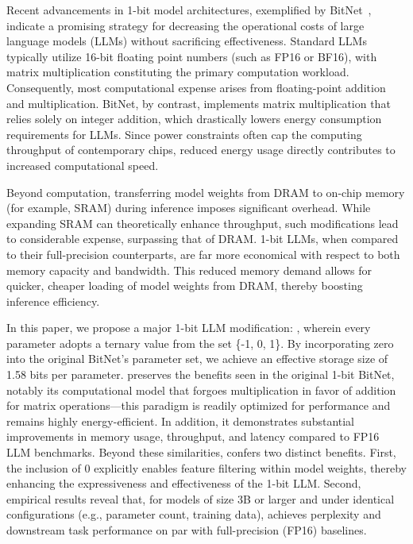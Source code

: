 Recent advancements in 1-bit model architectures, exemplified by BitNet~\cite{bitnet}, indicate a promising strategy for decreasing the operational costs of large language models (LLMs) without sacrificing effectiveness. Standard LLMs typically utilize 16-bit floating point numbers (such as FP16 or BF16), with matrix multiplication constituting the primary computation workload. Consequently, most computational expense arises from floating-point addition and multiplication. BitNet, by contrast, implements matrix multiplication that relies solely on integer addition, which drastically lowers energy consumption requirements for LLMs. Since power constraints often cap the computing throughput of contemporary chips, reduced energy usage directly contributes to increased computational speed.

Beyond computation, transferring model weights from DRAM to on-chip memory (for example, SRAM) during inference imposes significant overhead. While expanding SRAM can theoretically enhance throughput, such modifications lead to considerable expense, surpassing that of DRAM. 1-bit LLMs, when compared to their full-precision counterparts, are far more economical with respect to both memory capacity and bandwidth. This reduced memory demand allows for quicker, cheaper loading of model weights from DRAM, thereby boosting inference efficiency.

In this paper, we propose a major 1-bit LLM modification: \textbf{}, wherein every parameter adopts a ternary value from the set \{-1, 0, 1\}. By incorporating zero into the original BitNet’s parameter set, we achieve an effective storage size of 1.58 bits per parameter.  preserves the benefits seen in the original 1-bit BitNet, notably its computational model that forgoes multiplication in favor of addition for matrix operations—this paradigm is readily optimized for performance and remains highly energy-efficient. In addition, it demonstrates substantial improvements in memory usage, throughput, and latency compared to FP16 LLM benchmarks. Beyond these similarities,  confers two distinct benefits. First, the inclusion of 0 explicitly enables feature filtering within model weights, thereby enhancing the expressiveness and effectiveness of the 1-bit LLM. Second, empirical results reveal that, for models of size 3B or larger and under identical configurations (e.g., parameter count, training data),  achieves perplexity and downstream task performance on par with full-precision (FP16) baselines.

